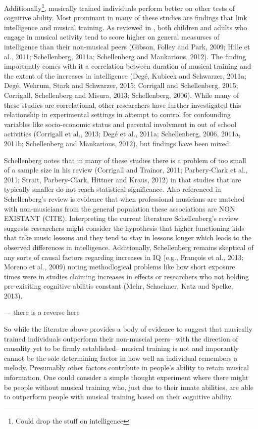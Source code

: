 \documentclass[]{book}
\let\rmarkdownfootnote\footnote%
\def\footnote{\protect\rmarkdownfootnote}
\begin{document}
Additionally\footnote{Could drop the stuff on intelligence}, musically trained individuals perform better on other tests of cognitive ability.
Most prominant in many of these studies are findings that link intelligence and musical training.
As reviewed in \citet{schellenbergMusicNonmusicalAbilities2017}, both children and adults who engage in musical activity tend to score higher on general measurses of intelligence than their non-musical peers (Gibson, Folley and Park, 2009; Hille et al., 2011; Schellenberg, 2011a; Schellenberg and Mankarious, 2012).
The finding importantly comes with it a correlation between duration of musical training and the extent of the increases in intelligence (Degé, Kubicek and Schwarzer, 2011a; Degé, Wehrum, Stark and Schwarzer, 2015; Corrigall and Schellenberg, 2015; Corrigall, Schellenberg and Misura, 2013; Schellenberg, 2006).
While many of these studies are correlational, other researchers have further investigated this relationship in experimental settings in attempt to control for confounding variables like socio-economic status and parental involvment in out of school activities (Corrigall et al., 2013; Degé et al., 2011a; Schellenberg, 2006, 2011a, 2011b; Schellenberg and Mankarious, 2012), but findings have been mixed.

Schellenberg \citep{schellenbergMusicNonmusicalAbilities2017} notes that in many of these studies there is a problem of too small of a sample size in his review (Corrigall and Trainor, 2011; Parbery-Clark et al., 2011; Strait, Parbery-Clark, Hittner and Kraus, 2012) in that studies that are typically smaller do not reach statistical significance.
Also referenced in Schellenberg's review is evidence that when professional musicians are matched with non-musicians from the general population these associations are NON EXISTANT (CITE).
Interpreting the current literature Schellenberg's review suggests researchers might consider the hypothesis that higher functioning kids that take music lessons and they tend to stay in lessons longer which leads to the observed differences in intelligence.
Additionally, Schellenberg remains skeptical of any sorts of causal factors regarding increases in IQ (e.g., François et al., 2013; Moreno et al., 2009) noting methodlogical problems like how short exposure times were in studies claiming increases in effects or researchers who not holding pre-exisiting cognitive abilitis constant (Mehr, Schachner, Katz and Spelke, 2013).

--- there is a reverse here

So while the literatre above provides a body of evidence to suggest that musically trained individuals outperform their non-muscial peers-- with the direction of causality yet to be firmly established-- musical training is not and imporantly cannot be the sole determining factor in how well an individual remembers a melody.
Presumably other factors contribute in people's ability to retain musical information.
One could consider a simple thought experiment where there might be people without musical training who, just due to their innate abilities, are able to outperform people with musical training based on their cognitive ability.
\end{document}
